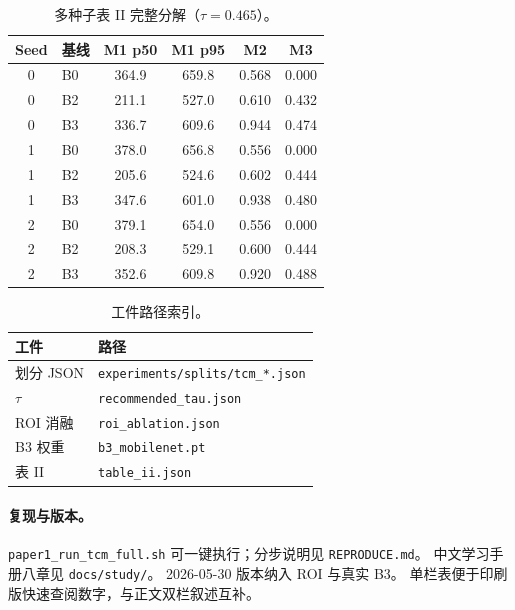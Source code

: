 \begin{table}[h]
\centering
\caption{多种子表 II 完整分解（$\tau{=}0.465$）。}
\label{tab:seed-breakdown-zh}
\small
\begin{tabular}{clcccc}
\hline
Seed & 基线 & M1 p50 & M1 p95 & M2 & M3 \\
\hline
0 & B0 & 364.9 & 659.8 & 0.568 & 0.000 \\
0 & B2 & 211.1 & 527.0 & 0.610 & 0.432 \\
0 & B3 & 336.7 & 609.6 & 0.944 & 0.474 \\
1 & B0 & 378.0 & 656.8 & 0.556 & 0.000 \\
1 & B2 & 205.6 & 524.6 & 0.602 & 0.444 \\
1 & B3 & 347.6 & 601.0 & 0.938 & 0.480 \\
2 & B0 & 379.1 & 654.0 & 0.556 & 0.000 \\
2 & B2 & 208.3 & 529.1 & 0.600 & 0.444 \\
2 & B3 & 352.6 & 609.8 & 0.920 & 0.488 \\
\hline
\end{tabular}
\end{table}

\begin{table}[h]
\centering
\caption{工件路径索引。}
\label{tab:artifact-paths-zh}
\small
\begin{tabular}{ll}
\hline
工件 & 路径 \\
\hline
划分 JSON & \texttt{experiments/splits/tcm\_*.json} \\
$\tau$ & \texttt{recommended\_tau.json} \\
ROI 消融 & \texttt{roi\_ablation.json} \\
B3 权重 & \texttt{b3\_mobilenet.pt} \\
表 II & \texttt{table\_ii.json} \\
\hline
\end{tabular}
\end{table}

\twocolumn

\paragraph{复现与版本。}
\texttt{paper1\_run\_tcm\_full.sh} 可一键执行；分步说明见 \texttt{REPRODUCE.md}。
中文学习手册八章见 \texttt{docs/study/}。
2026-05-30 版本纳入 ROI 与真实 B3。
单栏表便于印刷版快速查阅数字，与正文双栏叙述互补。

